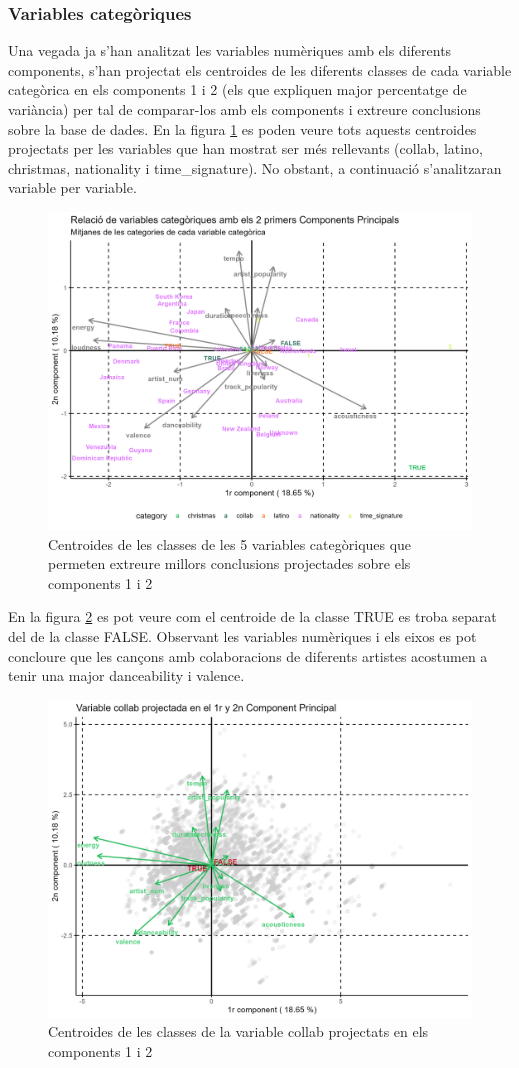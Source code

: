 \subsubsection{Variables categòriques}
Una vegada ja s'han analitzat les variables numèriques amb els diferents components, s'han projectat els centroides de les diferents classes de cada variable categòrica en els components 1 i 2 (els que expliquen major percentatge de variància) per tal de comparar-los amb els components i extreure conclusions sobre la base de dades. En la figura \ref{fig:6_FM:ACP_all_cat} es poden veure tots aquests centroides projectats per les variables que han mostrat ser més rellevants (collab, latino, christmas, nationality i time\_signature). No obstant, a continuació s'analitzaran variable per variable.

\begin{figure}[H]
    \centering
    \includegraphics[width=0.8\linewidth]{Images/6_Factorial_Methods/ACP/All_Cat_C1_C2_nationality.png}
    \caption{Centroides de les classes de les 5 variables categòriques que permeten extreure millors conclusions projectades sobre els components 1 i 2}
    \label{fig:6_FM:ACP_all_cat}
\end{figure}

En la figura \ref{fig:6_FM:ACP_collab} es pot veure com el centroide de la classe TRUE es troba separat del de la classe FALSE. Observant les variables numèriques i els eixos es pot concloure que les cançons amb colaboracions de diferents artistes acostumen a tenir una major danceability i valence.

\begin{figure}[H]
    \centering
    \includegraphics[width=0.6\linewidth]{Images/6_Factorial_Methods/ACP/Cat_C1_C2_collab.png}
    \caption{Centroides de les classes de la variable collab projectats en els components 1 i 2}
    \label{fig:6_FM:ACP_collab}
\end{figure}

